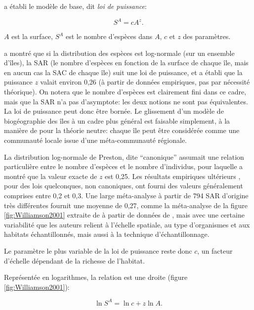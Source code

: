 \documentclass[
  11pt,
  french,
  a4paper,
  extrafontsizes,onecolumn,openright
  ]{memoir}
\begin{document}
\textcite{Arrhenius1921} a établi le modèle de base, dit \emph{loi de puissance}:

\begin{equation} 
  \label{eq:Arrhenius1921}
  S^{A} = c A^{z}.
\end{equation}

\(A\) est la surface, \(S^{A}\) est le nombre d'espèces dans \(A\), \(c\) et \(z\) des paramètres.

\textcite{Preston1962} a montré que si la distribution des espèces est log-normale (sur un ensemble d'îles), la SAR (le nombre d'espèces en fonction de la surface de chaque île, mais en aucun cas la SAC de chaque île) suit une loi de puissance, et a établi que la puissance \(z\) valait environ 0,26 (à partir de données empiriques, pas par nécessité théorique).
On notera que le nombre d'espèces est clairement fini dans ce cadre, mais que la SAR n'a pas d'asymptote: les deux notions ne sont pas équivalentes.
La loi de puissance peut donc être bornée.
Le glissement d'un modèle de biogéographie des îles à un cadre plus général est faisable simplement, à la manière de \textcite{Hubbell2001} pour la théorie neutre: chaque île peut être considérée comme une communauté locale issue d'une méta-communauté régionale.

La distribution log-normale de Preston, dite ``canonique'' assumait une relation particulière entre le nombre d'espèces et le nombre d'individus, pour laquelle \textcite{May1975} a montré que la valeur exacte de \(z\) est 0,25.
Les résultats empiriques ultérieurs \autocite{May1975,May2000}, pour des lois quelconques, non canoniques, ont fourni des valeurs généralement comprises entre 0,2 et 0,3.
Une large méta-analyse \autocite{Drakare2006} à partir de 794 SAR d'origine très différentes fournit une moyenne de 0,27, comme la méta-analyse de la figure \ref{fig:Williamson2001} extraite de \textcite{Williamson2001} à partir de données de \textcite{Lonsdale1999}, mais avec une certaine variabilité que les auteurs relient à l'échelle spatiale, au type d'organismes et aux habitats échantillonnés, mais aussi à la technique d'échantillonnage.

Le paramètre le plus variable de la loi de puissance reste donc \(c\), un facteur d'échelle dépendant de la richesse de l'habitat.

Représentée en logarithmes, la relation est une droite (figure \ref{fig:Williamson2001}):

\begin{equation}
  \label{eq:Arrhenius1921log}
  \ln S^{A} = \ln c + z\ln A.
\end{equation}
\end{document}
